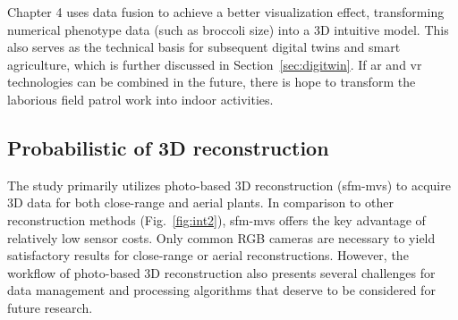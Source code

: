   Chapter 4 uses data fusion to achieve a better visualization effect, 
  transforming numerical phenotype data (such as broccoli size) into a 3D intuitive model. 
  This also serves as the technical basis for subsequent digital twins and smart agriculture, which is further discussed in Section~\ref{sec:digitwin}. 
  If \gls{ar} and \gls{vr} technologies can be combined in the future, 
  there is hope to transform the laborious field patrol work into indoor activities. 



\subsection{Probabilistic of 3D reconstruction}


  The study primarily utilizes photo-based 3D reconstruction (\mbox{\gls{sfm}-\gls{mvs}}) to acquire 3D data for both close-range and aerial plants. 
  In comparison to other reconstruction methods (Fig.~\ref{fig:int2}), \mbox{\gls{sfm}-\gls{mvs}} offers the key advantage of relatively low sensor costs. 
  Only common RGB cameras are necessary to yield satisfactory results for close-range or aerial reconstructions.
  However, the workflow of photo-based 3D reconstruction also presents several challenges for data management and processing algorithms that deserve to be considered for future research.



